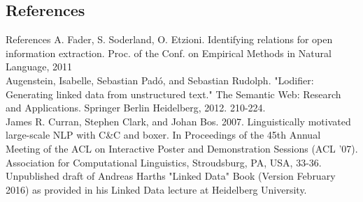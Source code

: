 \documentclass[11pt]{beamer}
\begin{document}
	\subsection{References}
	\begin{frame}[allowframebreaks]{References}
		A. Fader, S. Soderland, O. Etzioni. Identifying relations for open information extraction. Proc. of the Conf. on Empirical Methods in Natural Language, 2011\\
		\vspace{7pt}
		Augenstein, Isabelle, Sebastian Padó, and Sebastian Rudolph. "Lodifier: Generating linked data from unstructured text." The Semantic Web: Research and Applications. Springer Berlin Heidelberg, 2012. 210-224.\\
		\framebreak
		James R. Curran, Stephen Clark, and Johan Bos. 2007. Linguistically motivated large-scale NLP with C\&C and boxer. In Proceedings of the 45th Annual Meeting of the ACL on Interactive Poster and Demonstration Sessions (ACL '07). Association for Computational Linguistics, Stroudsburg, PA, USA, 33-36.\\
		\vspace{7pt}
		Unpublished draft of Andreas Harths "Linked Data" Book (Version February 2016) as provided in his Linked Data lecture at Heidelberg University.
	\end{frame}
\end{document}
